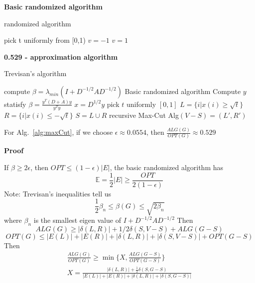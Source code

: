 \textbf{Basic randomized algorithm}
\begin{algorithm}[H]
\caption{randomized algorithm}
\begin{algorithmic}[1]
    \STATE pick t uniformly from [0,1)
        \STATE $v=-1$
    \ELSE
        \STATE $v=1$
     \ENDIF
\ENDFOR

\end{algorithmic}
\end{algorithm}
\textbf{0.529 - approximation algorithm}
\begin{algorithm}[H]
\caption{Trevisan’s algorithm }
\begin{algorithmic}[1]
    \STATE compute $\beta = \lambda_{min}(I+D^{-1/2}AD^{-1/2})$
    \IF{$\beta>2\epsilon$}
        \RETURN Basic randomized algorithm
    \ELSE
        \STATE Compute $y$ statisfy $\beta=\frac{y^T(D+A)y}{y^Ty}$
        \STATE $x=D^{1/2}y$
        \STATE pick $t$ uniformly $[0,1]$
        \STATE $L=\{i|x(i)\geq \sqrt{t} \}$
        \STATE $R=\{i|x(i)\leq -\sqrt{t} \}$
        \STATE $S=L\cup R$
        \STATE recursive Max-Cut Alg$(V-S)=(L',R')$
        \RETURN {}
     \ENDIF
\ENDFOR
\end{algorithmic}
\label{alg:maxCut}
\end{algorithm}
For Alg.~\ref{alg:maxCut}, if we choose $\epsilon \approx 0.0554 $, then  $\frac{ALG(G)}{OPT(G)} \approx 0.529$

\textbf{Proof}

If $\beta \ge 2\epsilon$, then $OPT\le (1-\epsilon)|E|$, the basic randomized algorithm has \[
\mathbb{E}=\frac{1}{2}|E|\geq \frac{OPT}{2(1-\epsilon)}
\]
Note: Trevisan’s inequalities tell us 
\[
 \frac{1}{2}\beta_n \leq \beta(G) \leq \sqrt{2\beta_n}
\]
where $\beta_n$ is the smallest eigen value of $I+D^{-1/2}AD^{-1/2}$ 
Then 
\[
ALG(G)\geq |\delta(L,R)|+1/2\delta(S,V-S)+ALG(G-S)
\]
\[
OPT(G)\leq|E(L)|+|E(R)|+|\delta(L,R)|+|\delta(S,V-S)|+OPT(G-S)
\]
Then
\begin{equation}
\begin{gathered}
        \frac{ALG(G)}{OPT(G)}\geq\min\{X,\frac{ALG(G-S)}{OPT(G-S)}\} \\
    X=\frac{|\delta(L,R)|+\frac{1}{2}\delta(S,G-S)}{|E(L)|+|E(R)|+|\delta(L,R)|+|\delta(S,G-S)|}
\end{gathered}
\end{equation}

